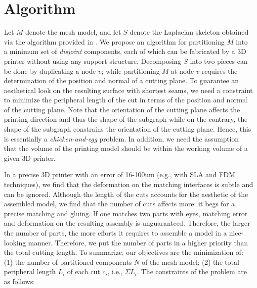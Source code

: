 \section{Algorithm}
Let $M$ denote the mesh model, and let $S$ denote the Laplacian skeleton obtained via the algorithm provided in \cite{AuTCCL08}. We propose an algorithm for partitioning $M$ into a minimum set of \emph{disjoint} components, each of which can be fabricated by a 3D printer without using any support structure. Decomposing $S$ into two pieces can be done by duplicating a node $v$; while partitioning $M$ at node $v$ requires the determination of the position and normal of a cutting plane. To guarantee an aesthetical look on the resulting surface with shortest seams, we need a constraint to minimize the peripheral length of the cut in terms of the position and normal of the cutting plane. Note that the orientation of the cutting plane affects the printing direction and thus the shape of the subgraph while on the contrary, the shape of the subgraph constrains the orientation of the cutting plane. Hence, this is essentially a \emph{chicken-and-egg} problem. {In addition, we need the assumption that the volume of the printing model should be within the working volume of a given 3{D} printer.}

In a precise 3D printer with an error of 16-100um (e.g., with SLA and FDM techniques), we find that the deformation on the matching interfaces is subtle and can be ignored. Although the length of the cuts accounts for the aesthetic of the assembled model, we find that the number of cuts affects more: it begs for a precise matching and gluing. If one matches two parts with eyes, matching error and deformation on the resulting assembly is unguaranteed. Therefore, the larger the number of parts, the more efforts it requires to assemble a model in a nice-looking manner. Therefore, we put the number of parts in a higher priority than the total cutting length. To summarize, our objectives are the minimization of: (1) the number of partitioned components $N$ of the mesh model; (2) the total peripheral length $L_i$ of each cut $c_i$, i.e., $\Sigma L_i$. The constraints of the problem are as follows:


